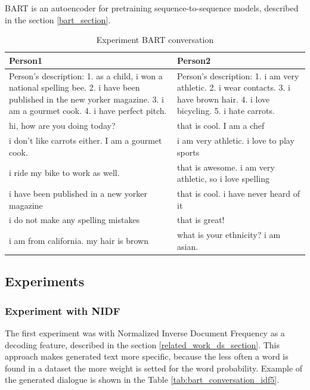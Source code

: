 BART is an autoencoder for pretraining sequence-to-sequence models, described in the section \ref{bart_section}.

\begin{table}[ht]
\centering
 \begin{tabular}{|p{7cm}|p{7cm}|} 
 \hline\hline
 \textbf{Person1} & \textbf{Person2} \\
 \hline\hline
 Person's description: 1. as a child, i won a national spelling bee. 2. i have been published in the new yorker magazine. 3. i am a gourmet cook. 4. i have perfect pitch. & Person's description: 1. i am very athletic. 2. i wear contacts. 3. i have brown hair. 4. i love bicycling. 5. i hate carrots. \\
 \hline
 hi, how are you doing today? & that is cool. I am a chef\\ 
 \hline
 i don't like carrots either. I am a gourmet cook.& i am very athletic. i love to play sports \\
 \hline
 i ride my bike to work as well. & that is awesome. i am very athletic, so i love spelling \\
 \hline 
 i have been published in a new yorker magazine & that is cool. i have never heard of it \\
 \hline
 i do not make any spelling mistakes & that is great! \\
 \hline 
 i am from california. my hair is brown & what is your ethnicity? i am asian. \\
 \hline\hline
 \end{tabular}
 \caption{Experiment BART conversation}
\label{tab:bart_conversation}
\end{table}

\subsection{Experiments}

\subsubsection{Experiment with NIDF}
The first experiment was with Normalized Inverse Document Frequency as a decoding feature, described in the section \ref{related_work_ds_section}. This approach makes generated text more specific, because the less often a word is found in a dataset the more weight is setted for the word probability. Example of the generated dialogue is shown in the Table \ref{tab:bart_conversation_idf5}.

